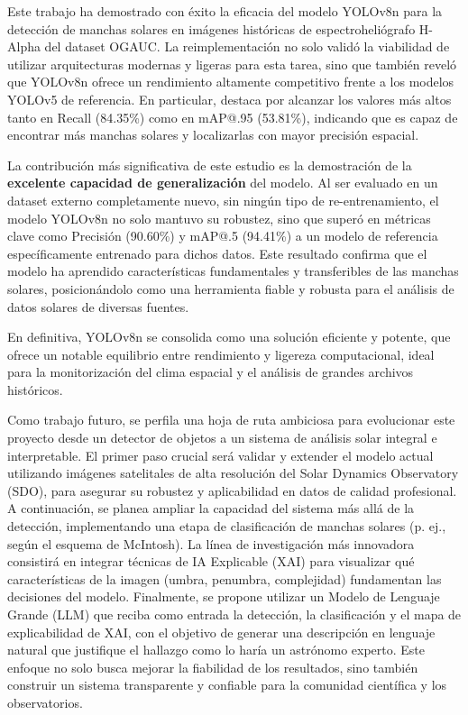 \documentclass[journal]{IEEEtran}
\begin{document}
Este trabajo ha demostrado con éxito la eficacia del modelo YOLOv8n para la detección de manchas solares en imágenes históricas de espectroheliógrafo H-Alpha del dataset OGAUC. La reimplementación no solo validó la viabilidad de utilizar arquitecturas modernas y ligeras para esta tarea, sino que también reveló que YOLOv8n ofrece un rendimiento altamente competitivo frente a los modelos YOLOv5 de referencia. En particular, destaca por alcanzar los valores más altos tanto en Recall (84.35\%) como en mAP@.95 (53.81\%), indicando que es capaz de encontrar más manchas solares y localizarlas con mayor precisión espacial.

La contribución más significativa de este estudio es la demostración de la \textbf{excelente capacidad de generalización} del modelo. Al ser evaluado en un dataset externo completamente nuevo, sin ningún tipo de re-entrenamiento, el modelo YOLOv8n no solo mantuvo su robustez, sino que superó en métricas clave como Precisión (90.60\%) y mAP@.5 (94.41\%) a un modelo de referencia específicamente entrenado para dichos datos. Este resultado confirma que el modelo ha aprendido características fundamentales y transferibles de las manchas solares, posicionándolo como una herramienta fiable y robusta para el análisis de datos solares de diversas fuentes.

En definitiva, YOLOv8n se consolida como una solución eficiente y potente, que ofrece un notable equilibrio entre rendimiento y ligereza computacional, ideal para la monitorización del clima espacial y el análisis de grandes archivos históricos.

Como trabajo futuro, se perfila una hoja de ruta ambiciosa para evolucionar este proyecto desde un detector de objetos a un sistema de análisis solar integral e interpretable. El primer paso crucial será validar y extender el modelo actual utilizando imágenes satelitales de alta resolución del Solar Dynamics Observatory (SDO), para asegurar su robustez y aplicabilidad en datos de calidad profesional. A continuación, se planea ampliar la capacidad del sistema más allá de la detección, implementando una etapa de clasificación de manchas solares (p. ej., según el esquema de McIntosh). La línea de investigación más innovadora consistirá en integrar técnicas de IA Explicable (XAI) para visualizar qué características de la imagen (umbra, penumbra, complejidad) fundamentan las decisiones del modelo. Finalmente, se propone utilizar un Modelo de Lenguaje Grande (LLM) que reciba como entrada la detección, la clasificación y el mapa de explicabilidad de XAI, con el objetivo de generar una descripción en lenguaje natural que justifique el hallazgo como lo haría un astrónomo experto. Este enfoque no solo busca mejorar la fiabilidad de los resultados, sino también construir un sistema transparente y confiable para la comunidad científica y los observatorios.
\end{document}
